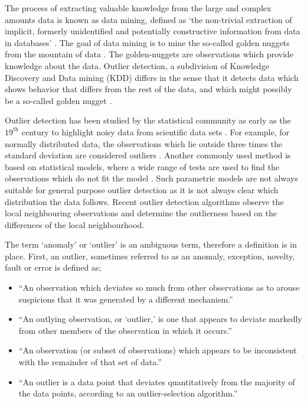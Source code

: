 The process of extracting valuable knowledge from the large and complex amounts data is known as data mining, defined as `the non-trivial extraction of implicit, formerly unidentified and potentially constructive information from data in databases' \cite{Zaiane99introductionto,Kantardzic:2002:DMC:581837}. The goal of data mining is to mine the so-called golden nuggets from the mountain of data \cite{1347303}. The golden-nuggets are observations which provide knowledge about the data. Outlier detection, a subdivision of Knowledge Discovery and Data mining (KDD) differs in the sense that it detects data which shows behavior that differs from the rest of the data, and which might possibly be a so-called golden nugget \cite{Chandola:2009:ADS:1541880.1541882}.

Outlier detection has been studied by the statistical community as early as the $19^{\text{th}}$ century to highlight noisy data from scientific data sets \cite{14786448708628471}. For example, for normally distributed data, the observations which lie outside three times the standard deviation are considered outliers \cite{9783540262565}. Another commonly used method is based on statistical models, where a wide range of tests are used to find the observations which do not fit the model \cite{barnett1994outliers}. Such parametric models are not always suitable for general purpose outlier detection as it is not always clear which distribution the data follows. Recent outlier detection algorithms observe the local neighbouring observations and determine the outlierness based on the differences of the local neighbourhood.

The term `anomaly' or `outlier' is an ambiguous term, therefore a definition is in place. First, an outlier, sometimes referred to as an anomaly, exception, novelty, fault or error is defined as;
\begin{itemize}
  \item ``An observation which deviates so much from other observations as to arouse suspicions that it was generated by a different mechanism.'' \cite{Enderlein1987}
  \item ``An outlying observation, or ‘outlier,’ is one that appears to deviate markedly from other members of the observation in which it occurs.'' \cite{Grubbs1969}
  \item ``An observation (or subset of observations) which appears to be inconsistent with the remainder of that set of data.'' \cite{barnett1994outliers}
  \item ``An outlier is a data point that deviates quantitatively from the majority of the data points, according to an outlier-selection algorithm.'' \cite{outlierselection}
\end{itemize}

